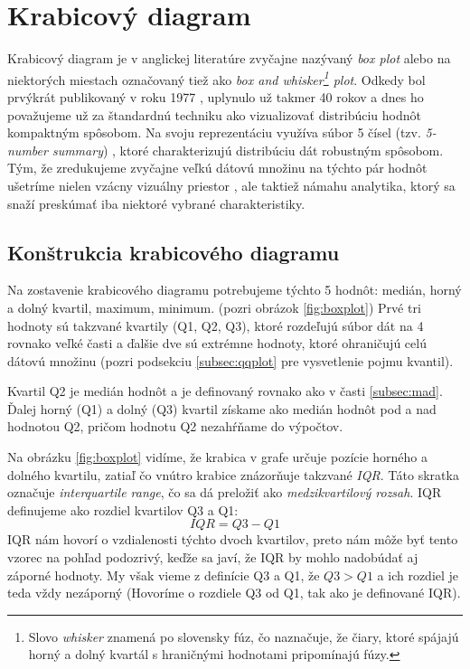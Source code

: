 \section{Krabicový diagram}
\label{subsec:boxplot}
Krabicový diagram je v anglickej literatúre zvyčajne nazývaný \textit{box plot} alebo na niektorých miestach označovaný tiež ako \textit{box and whisker\footnote{Slovo \textit{whisker} znamená po slovensky fúz, čo naznačuje, že čiary, ktoré spájajú horný a dolný kvartál s hraničnými hodnotami pripomínajú fúzy.} plot}. Odkedy bol prvýkrát publikovaný v roku 1977 \cite{Tukey}, uplynulo už takmer 40 rokov a dnes ho považujeme už za štandardnú techniku ako vizualizovať distribúciu hodnôt kompaktným spôsobom. Na svoju reprezentáciu využíva súbor 5 čísel (tzv. \textit{\mbox{5-number} summary}) \cite{Potter}, ktoré charakterizujú distribúciu dát robustným spôsobom. Tým, že zredukujeme zvyčajne veľkú dátovú množinu na týchto pár hodnôt ušetríme nielen vzácny vizuálny priestor \cite{Wickham}, ale taktiež námahu analytika, ktorý sa snaží preskúmať iba niektoré vybrané charakteristiky. 

\subsection{Konštrukcia krabicového diagramu}

Na zostavenie krabicového diagramu potrebujeme týchto 5 hodnôt: medián, horný a dolný kvartil, maximum, minimum. (pozri obrázok \ref{fig:boxplot}) Prvé tri hodnoty sú takzvané kvartily (Q1, Q2, Q3), ktoré rozdeľujú súbor dát na 4 rovnako veľké časti a ďalšie dve sú extrémne hodnoty, ktoré ohraničujú celú dátovú množinu (pozri podsekciu \ref{subsec:qqplot} pre vysvetlenie pojmu kvantil). 

Kvartil Q2 je medián hodnôt a je definovaný rovnako ako v časti \ref{subsec:mad}. Ďalej horný (Q1) a dolný (Q3) kvartil získame ako medián hodnôt pod a nad hodnotou Q2, pričom hodnotu Q2 nezahŕňame do výpočtov. 

Na obrázku \ref{fig:boxplot} vidíme, že krabica v grafe určuje pozície horného a dolného kvartilu, zatiaľ čo vnútro krabice znázorňuje takzvané \textit{IQR}. Táto skratka označuje \textit{interquartile range}, čo sa dá preložiť ako \textit{medzikvartilový rozsah}. IQR definujeme ako rozdiel kvartilov Q3 a Q1:
\[
IQR = Q3 - Q1
\]
IQR nám hovorí o vzdialenosti týchto dvoch kvartilov, preto nám môže byť tento vzorec na pohľad podozrivý, keďže sa javí, že IQR by mohlo nadobúdať aj záporné hodnoty. My však vieme z definície Q3 a Q1, že $ Q3 > Q1 $ a ich rozdiel je teda vždy nezáporný (Hovoríme o rozdiele Q3 od Q1, tak ako je definované IQR).

